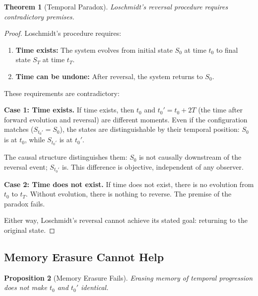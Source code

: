 \documentclass[twocolumn,10pt,a4paper]{article}
\newtheorem{theorem}{Theorem}[section]
\newtheorem{proposition}[theorem]{Proposition}
\theoremstyle{definition}
\theoremstyle{remark}
\begin{document}
\begin{theorem}[Temporal Paradox]
\label{thm:temporal_paradox}
Loschmidt's reversal procedure requires contradictory premises.
\end{theorem}

\begin{proof}
Loschmidt's procedure requires:
\begin{enumerate}
    \item \textbf{Time exists:} The system evolves from initial state $S_0$ at time $t_0$ to final state $S_T$ at time $t_T$.
    \item \textbf{Time can be undone:} After reversal, the system returns to $S_0$.
\end{enumerate}

These requirements are contradictory:

\textbf{Case 1: Time exists.}
If time exists, then $t_0$ and $t_0' = t_0 + 2T$ (the time after forward evolution and reversal) are different moments. Even if the configuration matches ($S_{t_0'} = S_0$), the states are distinguishable by their temporal position: $S_0$ is at $t_0$, while $S_{t_0'}$ is at $t_0'$.

The causal structure distinguishes them: $S_0$ is not causally downstream of the reversal event; $S_{t_0'}$ is. This difference is objective, independent of any observer.

\textbf{Case 2: Time does not exist.}
If time does not exist, there is no evolution from $t_0$ to $t_T$. Without evolution, there is nothing to reverse. The premise of the paradox fails.

Either way, Loschmidt's reversal cannot achieve its stated goal: returning to the original state.
\end{proof}

\subsection{Memory Erasure Cannot Help}

\begin{proposition}[Memory Erasure Fails]
Erasing memory of temporal progression does not make $t_0$ and $t_0'$ identical.
\end{proposition}
\end{document}
